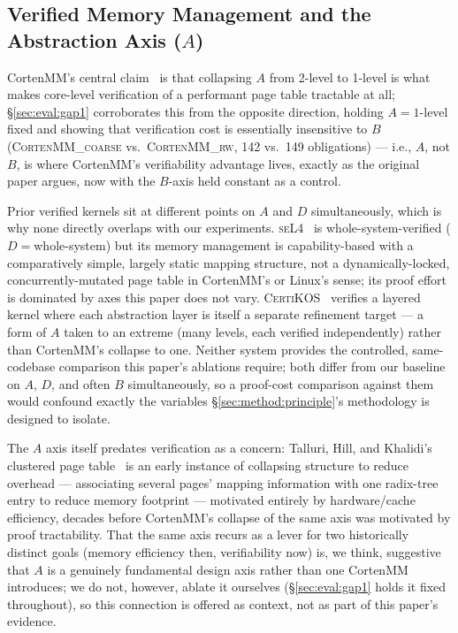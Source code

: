 \documentclass[10pt]{article}
\newcommand{\corten}[1]{\textsc{CortenMM\_#1}}
\begin{document}
\subsection{Verified Memory Management and the Abstraction Axis ($A$)}
\label{sec:related:abstraction}

CortenMM's central claim~\cite{cortenmm} is that collapsing $A$ from
2-level to 1-level is what makes core-level verification of a
performant page table tractable at all; \S\ref{sec:eval:gap1}
corroborates this from the opposite direction, holding $A{=}1$-level
fixed and showing that verification cost is essentially insensitive to
$B$ (\corten{coarse} vs.\ \corten{rw}, 142 vs.\ 149 obligations) ---
i.e., $A$, not $B$, is where CortenMM's verifiability advantage lives,
exactly as the original paper argues, now with the $B$-axis held
constant as a control.

Prior verified kernels sit at different points on $A$ and $D$
simultaneously, which is why none directly overlaps with our
experiments. \textsc{seL4}~\cite{sel4} is whole-system-verified
($D{=}$whole-system) but its memory management is capability-based
with a comparatively simple, largely static mapping structure, not a
dynamically-locked, concurrently-mutated page table in CortenMM's or
Linux's sense; its proof effort is dominated by axes this paper does
not vary. \textsc{CertiKOS}~\cite{certikos} verifies a layered kernel
where each abstraction layer is itself a separate refinement target
--- a form of $A$ taken to an extreme (many levels, each verified
independently) rather than CortenMM's collapse to one. Neither system
provides the controlled, same-codebase comparison this paper's
ablations require; both differ from our baseline on $A$, $D$, and
often $B$ simultaneously, so a proof-cost comparison against them would
confound exactly the variables \S\ref{sec:method:principle}'s
methodology is designed to isolate.

The $A$ axis itself predates verification as a concern: Talluri,
Hill, and Khalidi's clustered page
table~\cite{clustered-pagetable} is an early instance of collapsing
structure to reduce overhead --- associating several pages' mapping
information with one radix-tree entry to reduce memory footprint ---
motivated entirely by hardware/cache efficiency, decades before
CortenMM's collapse of the same axis was motivated by proof
tractability. That the same axis recurs as a lever for two
historically distinct goals (memory efficiency then, verifiability
now) is, we think, suggestive that $A$ is a genuinely fundamental
design axis rather than one CortenMM introduces; we do not, however,
ablate it ourselves (\S\ref{sec:eval:gap1} holds it fixed throughout),
so this connection is offered as context, not as part of this paper's
evidence.
\end{document}
